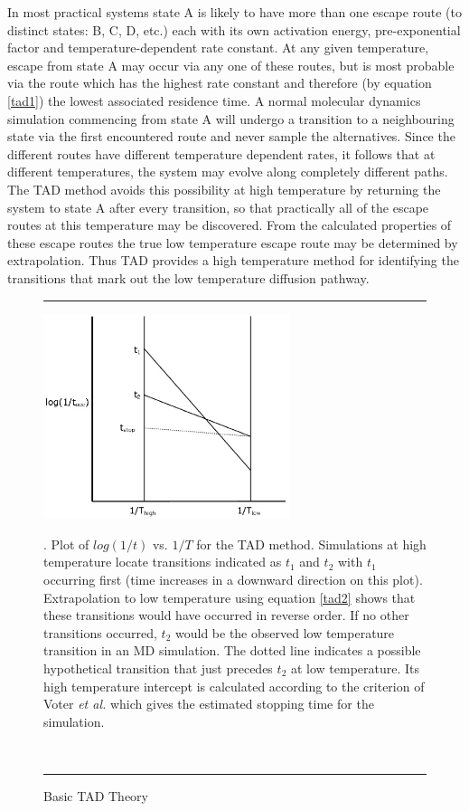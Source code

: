 In most practical systems state A is likely to have more than one escape route
(to distinct states: B, C, D, etc.) each with its own activation energy,
pre-exponential factor and temperature-dependent rate constant. At any given
temperature, escape from state A may occur via any one of these routes, but is
most probable via the route which has the highest rate constant and therefore
(by equation \ref{tad1}) the lowest associated residence time. A normal
molecular dynamics simulation commencing from state A will undergo a
transition to a neighbouring state via the first encountered route and never
sample the alternatives. Since the different routes have different temperature
dependent rates, it follows that at different temperatures, the system may
evolve along completely different paths. The TAD method avoids this
possibility at high temperature by returning the system to state A after every
transition, so that practically all of the escape routes at this temperature
may be discovered. From the calculated properties of these escape routes the
true low temperature escape route may be determined by extrapolation. Thus TAD
provides a high temperature method for identifying the transitions that mark
out the low temperature diffusion pathway.

\begin{figure}[ht]
\hrule
\vspace{1.0cm}
\begin{center}
\includegraphics[height=6cm]{TAD.ps}
\end{center}
\caption{Basic TAD Theory\label{tadfig}}. 
Plot of $log(1/t)$ vs. $1/T$ for the TAD method. Simulations at high
temperature locate transitions indicated as $t_1$ and $t_2$ with $t_1$
occurring first (time increases in a downward direction on this
plot). Extrapolation to low temperature using equation
\ref{tad2} shows that these transitions would have occurred in reverse
order. If no other transitions occurred, $t_2$ would be the observed
low temperature transition in an MD simulation. The dotted line
indicates a possible hypothetical transition that just precedes
$t_2$ at low temperature. Its high temperature intercept is calculated
according to the criterion of Voter {\em et al.} \cite{voter-00a}
which gives the estimated stopping time for the simulation.

~
\hrule
\end{figure}

